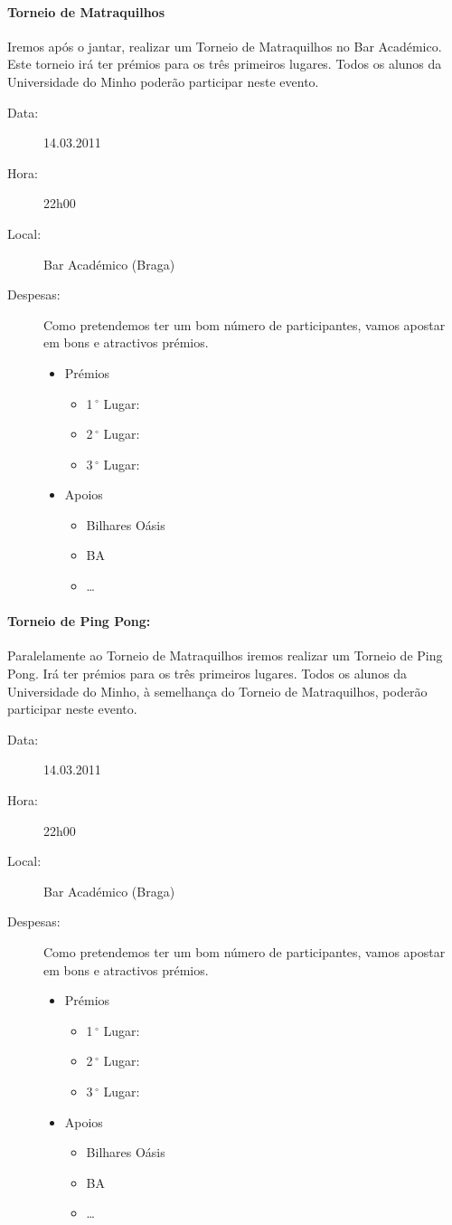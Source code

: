 \paragraph{Torneio de Matraquilhos}
Iremos após o jantar, realizar um Torneio de Matraquilhos no Bar Académico. Este torneio irá ter prémios para os três primeiros lugares. Todos os alunos da Universidade do Minho poderão participar neste evento.
\begin{description}
\item[Data:] 14.03.2011
\item[Hora:] 22h00
\item[Local:] Bar Académico (Braga)
\item[Despesas:] Como pretendemos ter um bom número de participantes, vamos apostar em bons e atractivos prémios.
\begin{itemize}
\item Prémios
\begin{itemize}
\item 1$\,^{\circ}$ Lugar:
\item 2$\,^{\circ}$ Lugar:
\item 3$\,^{\circ}$ Lugar:
\end{itemize}
\item Apoios
\begin{itemize}
\item Bilhares Oásis
\item BA
\item \dots  
\end{itemize}
\end{itemize}
\end{description}
%
\paragraph{Torneio de Ping Pong:}
Paralelamente ao Torneio de Matraquilhos iremos realizar um Torneio de Ping Pong. Irá ter prémios para os três primeiros lugares. Todos os alunos da Universidade do Minho, à semelhança do Torneio de Matraquilhos, poderão participar neste evento.
\begin{description}
\item[Data:] 14.03.2011
\item[Hora:] 22h00
\item[Local:] Bar Académico (Braga)
\item[Despesas:] Como pretendemos ter um bom número de participantes, vamos apostar em bons e atractivos prémios.
\begin{itemize}
\item Prémios
\begin{itemize}
\item 1$\,^{\circ}$ Lugar:
\item 2$\,^{\circ}$ Lugar:
\item 3$\,^{\circ}$ Lugar:
\end{itemize}
\item Apoios
\begin{itemize}
\item Bilhares Oásis
\item BA
\item \dots  
\end{itemize}
\end{itemize}
\end{description}
%
